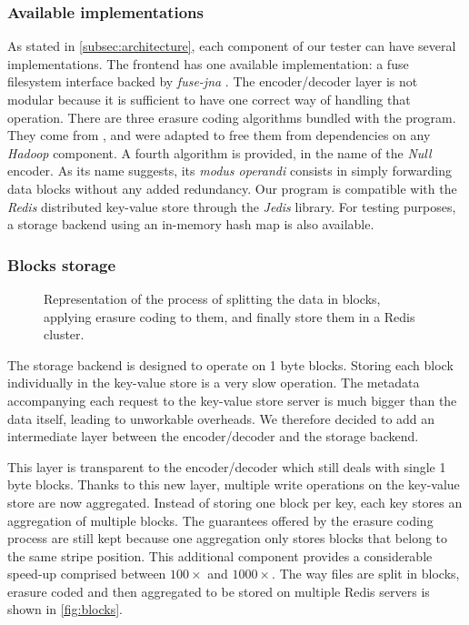 \subsubsection{Available implementations}

As stated in \autoref{subsec:architecture}, each component of our tester can have several implementations.
The frontend has one available implementation: a \ac{fuse} filesystem interface backed by \textit{fuse-jna} \autocite{fuse-jna}.
The encoder/decoder layer is not modular because it is sufficient to have one correct way of handling that operation.
There are three erasure coding algorithms bundled with the program.
They come from \autocite{XorbasVLDB}, and were adapted to free them from dependencies on any \textit{Hadoop} component.
A fourth algorithm is provided, in the name of the \textit{Null} encoder.
As its name suggests, its \textit{modus operandi} consists in simply forwarding data blocks without any added redundancy.
Our program is compatible with the \textit{Redis} distributed key-value store through the \textit{Jedis} library.
For testing purposes, a storage backend using an in-memory hash map is also available.

\subsubsection{Blocks storage}

\begin{figure}[H]
    \centering
    
    \caption{Representation of the process of splitting the data in blocks, applying erasure coding to them, and finally store them in a Redis cluster.}
    \label{fig:blocks}
\end{figure}

The storage backend is designed to operate on 1 byte blocks.
Storing each block individually in the key-value store is a very slow operation.
The metadata accompanying each request to the key-value store server is much bigger than the data itself, leading to unworkable overheads.
We therefore decided to add an intermediate layer between the encoder/decoder and the storage backend.

This layer is transparent to the encoder/decoder which still deals with single 1 byte blocks.
Thanks to this new layer, multiple write operations on the key-value store are now aggregated.
Instead of storing one block per key, each key stores an aggregation of multiple blocks.
The guarantees offered by the erasure coding process are still kept because one aggregation only stores blocks that belong to the same stripe position.
This additional component provides a considerable speed-up comprised between $100\times$ and $1000\times$.
The way files are split in blocks, erasure coded and then aggregated to be stored on multiple Redis servers is shown in \autoref{fig:blocks}.

